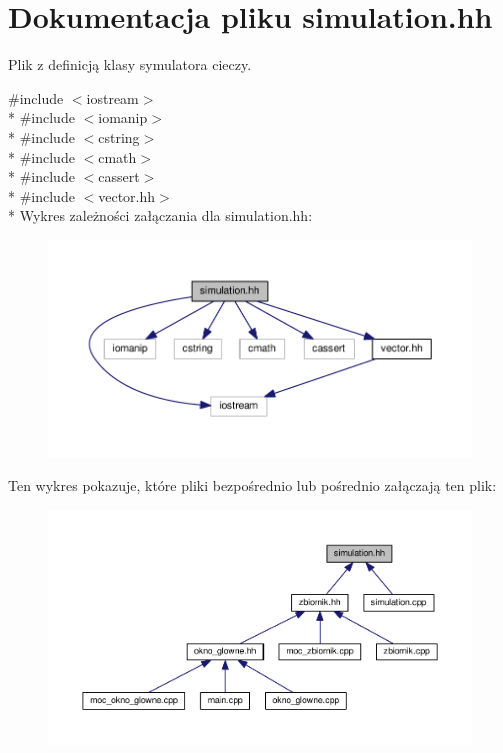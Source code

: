\hypertarget{simulation_8hh}{\section{Dokumentacja pliku simulation.\-hh}
\label{simulation_8hh}
}


Plik z definicją klasy symulatora cieczy.  


{\ttfamily \#include $<$iostream$>$}\\*
{\ttfamily \#include $<$iomanip$>$}\\*
{\ttfamily \#include $<$cstring$>$}\\*
{\ttfamily \#include $<$cmath$>$}\\*
{\ttfamily \#include $<$cassert$>$}\\*
{\ttfamily \#include $<$vector.\-hh$>$}\\*
Wykres zależności załączania dla simulation.\-hh\-:\nopagebreak
\begin{figure}[H]
\begin{center}
\leavevmode
\includegraphics[width=350pt]{simulation_8hh__incl}
\end{center}
\end{figure}
Ten wykres pokazuje, które pliki bezpośrednio lub pośrednio załączają ten plik\-:\nopagebreak
\begin{figure}[H]
\begin{center}
\leavevmode
\includegraphics[width=350pt]{simulation_8hh__dep__incl}
\end{center}
\end{figure}
